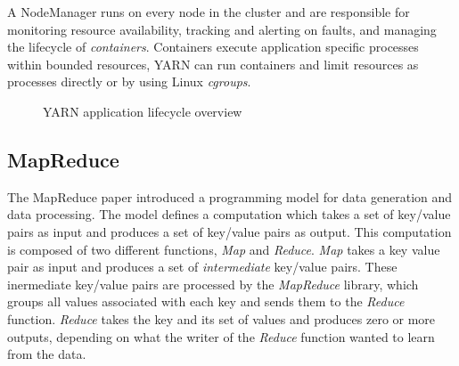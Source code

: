 \documentclass[conference]{IEEEtran}
\begin{document}
A NodeManager runs on every node in the cluster and are responsible for monitoring resource availability, tracking and alerting on faults, and managing the lifecycle of \emph{containers}. Containers execute application specific processes within bounded resources, YARN can run containers and limit resources as processes directly or by using Linux \emph{cgroups}.

\begin{figure}[ht]
\centering
{}
\caption{YARN application lifecycle overview}
\label{yarn}
\end{figure}


\subsection{MapReduce}
The MapReduce paper \cite{mapreduce} introduced a programming model for data generation and data processing. The model defines a computation which takes a set of key/value pairs as input and produces a set of key/value pairs as output.
This computation is composed of two different functions, \emph{Map} and \emph{Reduce}. \emph{Map} takes a key value pair as input and produces a set of \emph{intermediate} key/value pairs. These inermediate key/value pairs are processed by the \emph{MapReduce} library, which groups all values associated with each key and sends them to the \emph{Reduce} function. \emph{Reduce} takes the key and its set of values and produces zero or more outputs, depending on what the writer of the \emph{Reduce} function wanted to learn from the data.
\end{document}
